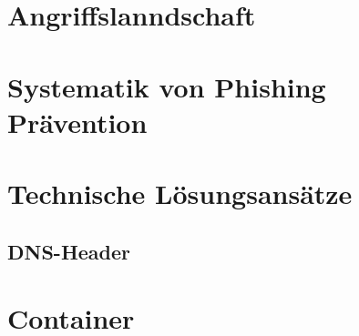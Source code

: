 \documentclass[journal=tosc,final]{iacrtrans}
\begin{document}
\section{Angriffslanndschaft}
\section{Systematik von Phishing Prävention}
\section{Technische Lösungsansätze}
\subsection{DNS-Header}
\section{Container}


\end{document}
